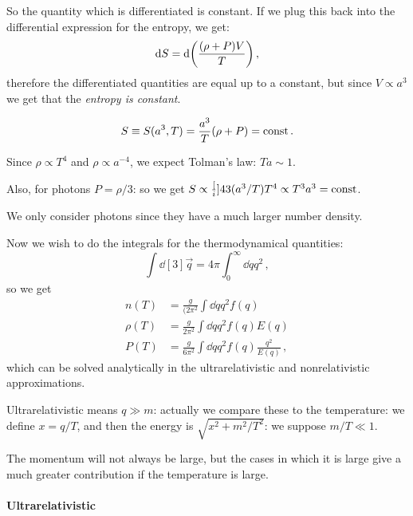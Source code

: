\documentclass[main.tex]{subfiles}
\begin{document}
So the quantity which is differentiated is constant. If we plug this back into the differential expression for the entropy, we get: 
%
\begin{equation}
  \dd{S} = \dd \qty(\frac{(\rho + P) V}{T})
\,,
\end{equation}
%
therefore the differentiated quantities are equal up to a constant, but since \(V \propto a^3\) we get that the \emph{entropy is constant}.

\begin{equation}
  S \equiv S(a^3, T) 
  = \frac{a^3}{T} \qty(\rho + P)
  = \text{const}
\,.
\end{equation}

Since \(\rho \propto T^{4}\) and \(\rho \propto a^{-4}\), we expect Tolman's law: \(Ta \sim 1\).

Also, for photons \(P  = \rho / 3\): so we get \(S \propto \frac[i]{4}{3} (a^3/T) T^{4} \propto T^3 a^3 = \text{const}\).

We only consider photons since they have a much larger number density.


Now we wish to do the integrals for the thermodynamical quantities: 
%
\begin{equation}
  \int  \dd[3]{\vec{q}} = 4 \pi \int_0^{\infty}  \dd{q} q^2 
\,,
\end{equation}
%
so we get 
%
\begin{subequations}
\begin{align}
  n(T) &= \frac{g}{(2\pi^2} \int  \dd{q} q^2 f(q) \\ 
  \rho (T) &= \frac{g}{2\pi^2} \int  \dd{q} q^2 f(q) E(q) \\ 
  P (T) &= \frac{g}{6\pi^2} \int  \dd{q} q^2 f(q) \frac{q^2}{E(q)} 
\,,
\end{align}
\end{subequations}
%
which can be solved analytically in the ultrarelativistic and nonrelativistic approximations.

Ultrarelativistic means \(q \gg m\): actually we compare these to the temperature: we define \(x = q/T\), and then the energy is \(\sqrt{x^2+ m^2/T^2} \): we suppose \( m/T \ll 1\).

The momentum will not always be large, but the cases in which it is large give a much greater contribution if the temperature is large.

\paragraph{Ultrarelativistic}
\end{document}
